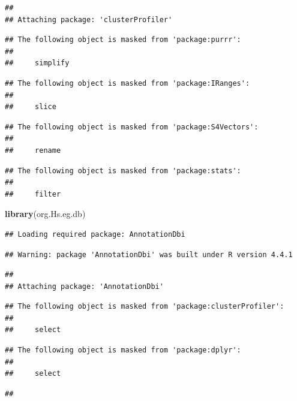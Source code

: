 \documentclass[
]{article}
\newenvironment{Shaded}{\begin{snugshade}}{\end{snugshade}}
\newcommand{\FunctionTok}[1]{\textcolor[rgb]{0.13,0.29,0.53}{\textbf{#1}}}
\newcommand{\NormalTok}[1]{#1}
\begin{document}
\begin{verbatim}
## 
## Attaching package: 'clusterProfiler'
\end{verbatim}

\begin{verbatim}
## The following object is masked from 'package:purrr':
## 
##     simplify
\end{verbatim}

\begin{verbatim}
## The following object is masked from 'package:IRanges':
## 
##     slice
\end{verbatim}

\begin{verbatim}
## The following object is masked from 'package:S4Vectors':
## 
##     rename
\end{verbatim}

\begin{verbatim}
## The following object is masked from 'package:stats':
## 
##     filter
\end{verbatim}

\begin{Shaded}
\begin{Highlighting}[]
\FunctionTok{library}\NormalTok{(org.Hs.eg.db)}
\end{Highlighting}
\end{Shaded}

\begin{verbatim}
## Loading required package: AnnotationDbi
\end{verbatim}

\begin{verbatim}
## Warning: package 'AnnotationDbi' was built under R version 4.4.1
\end{verbatim}

\begin{verbatim}
## 
## Attaching package: 'AnnotationDbi'
\end{verbatim}

\begin{verbatim}
## The following object is masked from 'package:clusterProfiler':
## 
##     select
\end{verbatim}

\begin{verbatim}
## The following object is masked from 'package:dplyr':
## 
##     select
\end{verbatim}

\begin{verbatim}
## 
\end{verbatim}
\end{document}
